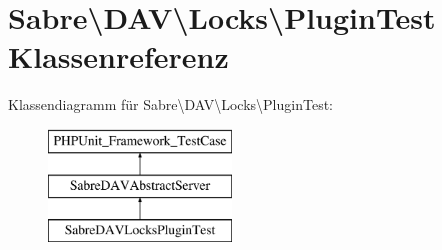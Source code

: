 \hypertarget{class_sabre_1_1_d_a_v_1_1_locks_1_1_plugin_test}{}\section{Sabre\textbackslash{}D\+AV\textbackslash{}Locks\textbackslash{}Plugin\+Test Klassenreferenz}
\label{class_sabre_1_1_d_a_v_1_1_locks_1_1_plugin_test}
Klassendiagramm für Sabre\textbackslash{}D\+AV\textbackslash{}Locks\textbackslash{}Plugin\+Test\+:\begin{figure}[H]
\begin{center}
\leavevmode
\includegraphics[height=3.000000cm]{class_sabre_1_1_d_a_v_1_1_locks_1_1_plugin_test}
\end{center}
\end{figure}
